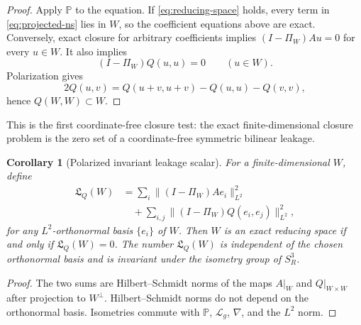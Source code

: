\documentclass[aps,prd,reprint,superscriptaddress,nofootinbib,floatfix]{revtex4-2}
\newtheorem{corollary}[theorem]{Corollary}
\theoremstyle{definition}
\theoremstyle{remark}
\newcommand{\PP}{\mathbb{P}}
\begin{document}
\begin{proof}
	Apply \(\PP\) to the equation.  If \eqref{eq:reducing-space} holds, every term in \eqref{eq:projected-ns} lies in \(W\), so the coefficient equations above are exact.  Conversely, exact closure for arbitrary coefficients implies \((I-\Pi_W)Au=0\) for every \(u\in W\).  It also implies
	\[
		(I-\Pi_W)Q(u,u)=0\qquad (u\in W).
	\]
	Polarization gives
	\[
		2Q(u,v)=Q(u+v,u+v)-Q(u,u)-Q(v,v),
	\]
	hence \(Q(W,W)\subset W\).
\end{proof}

This is the first coordinate-free closure test: the exact finite-dimensional closure problem is the zero set of a coordinate-free symmetric bilinear leakage.

\begin{corollary}[Polarized invariant leakage scalar]\label{cor:polarizedleakage}
	For a finite-dimensional \(W\), define
	\begin{equation}
		\begin{aligned}
			\mathfrak L_Q(W)
			 & =
			\sum_i\|(I-\Pi_W)Ae_i\|_{L^2}^2 \\
			 & \quad+
			\sum_{i,j}\|(I-\Pi_W)Q(e_i,e_j)\|_{L^2}^2 ,
		\end{aligned}
		\label{eq:leakageQ}
	\end{equation}
	for any \(L^2\)-orthonormal basis \(\{e_i\}\) of \(W\).  Then \(W\) is an exact reducing space if and only if \(\mathfrak L_Q(W)=0\).  The number \(\mathfrak L_Q(W)\) is independent of the chosen orthonormal basis and is invariant under the isometry group of \(S^3_R\).
\end{corollary}

\begin{proof}
	The two sums are Hilbert--Schmidt norms of the maps \(A|_W\) and \(Q|_{W\times W}\) after projection to \(W^\perp\).  Hilbert--Schmidt norms do not depend on the orthonormal basis.  Isometries commute with \(\PP\), \(\mathcal L_g\), \(\nabla\), and the \(L^2\) norm.
\end{proof}
\end{document}
